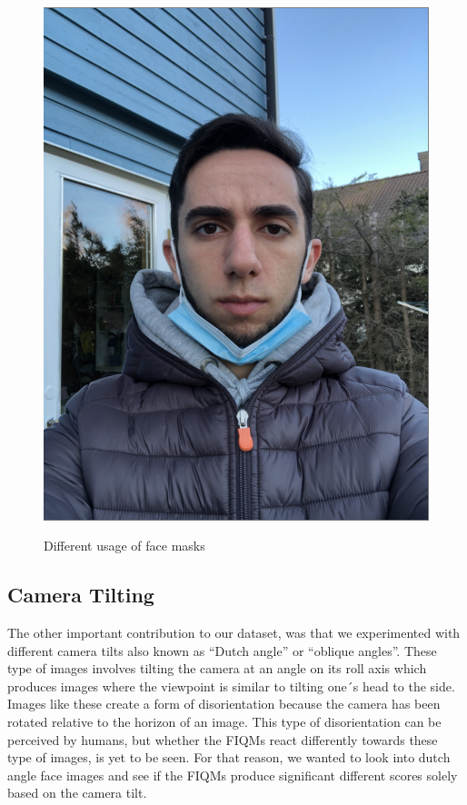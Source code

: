 \begin{figure}[h]
        {\includegraphics[scale = 0.18]{figures/1152.png}\hspace{1cm}}
    \caption{Different usage of face masks}
    \label{fig:masks}
\end{figure}


\subsection*{Camera Tilting}
The other important contribution to our dataset, was that we experimented with different camera tilts also known as ``Dutch angle'' or ``oblique angles''. These type of images involves tilting the camera at an angle on its roll axis which produces images where the viewpoint is similar to tilting one´s head to the side. Images like these create a form of disorientation because the camera has been rotated relative to the horizon of an image. This type of disorientation can be perceived by humans, but whether the FIQMs react differently towards these type of images, is yet to be seen. For that reason, we wanted to look into dutch angle face images and see if the FIQMs produce significant different scores solely based on the camera tilt. 


